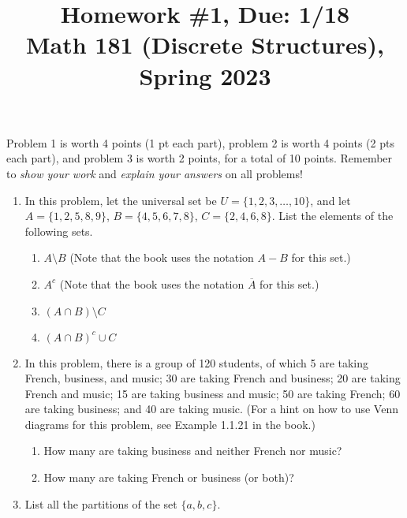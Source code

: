 \documentclass[11pt]{article}
\title{Homework \#1, Due: 1/18 \\Math 181 (Discrete Structures), Spring 2023}
\date{}
\begin{document}
\maketitle

\thispagestyle{empty}

\vspace{-1cm}

Problem 1 is worth 4 points (1 pt each part), problem 2 is worth 4 points (2 pts each part), and problem 3 is worth 2 points, for a total of 10 points. Remember to \emph{show your work} and \emph{explain your answers} on all problems!

\begin{enumerate}
\item In this problem, let the universal set be $U=\{1,2,3,\ldots,10\}$, and let $A=\{1,2,5,8,9\}$, $B=\{4,5,6,7,8\}$,  $C=\{2,4,6,8\}$. List the elements of the following sets.

\begin{enumerate}
\item $A \setminus B$ \hfill (Note that the book uses the notation $A-B$ for this set.)
\item $A^c$ \hfill (Note that the book uses the notation $\overline{A}$ for this set.)
\item $(A\cap B) \setminus C$
\item $(A \cap B)^c \cup C$
\end{enumerate}

\item In this problem, there is a group of 120 students, of which 5 are taking French, business, and music; 30 are taking French and business; 20 are taking French and music; 15 are taking business and music; 50 are taking French; 60 are taking business; and 40 are taking music. (For a hint on how to use Venn diagrams for this problem, see Example 1.1.21 in the book.)

\begin{enumerate}
\item How many are taking business and neither French nor music?
\item How many are taking French or business (or both)?
\end{enumerate}

\item List all the partitions of the set $\{a,b,c\}$.

\end{enumerate}
\end{document}
